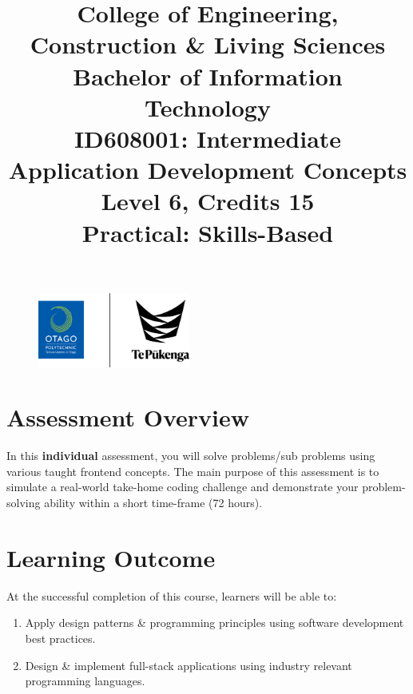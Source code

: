 \documentclass{article}
\author{}
\begin{document}
\begin{figure}
	\centering
	\includegraphics[width=50mm]{../../resources/img/logo.png}
\end{figure}

\title{College of Engineering, Construction \& Living Sciences\\Bachelor of Information Technology\\ID608001: Intermediate Application Development Concepts\\Level 6, Credits 15\\\textbf{Practical: Skills-Based}}
\date{}
\maketitle

\section*{Assessment Overview}
In this \textbf{individual} assessment, you will solve  problems/sub problems using various taught frontend concepts. The main purpose of this assessment is to simulate a real-world take-home coding challenge and demonstrate your problem-solving ability within a short time-frame (72 hours).

\section*{Learning Outcome}
At the successful completion of this course, learners will be able to:
\begin{enumerate}
	\item Apply design patterns \& programming principles using software development best practices.
	\item Design \& implement full-stack applications using industry relevant programming languages.
\end{enumerate}
\end{document}
